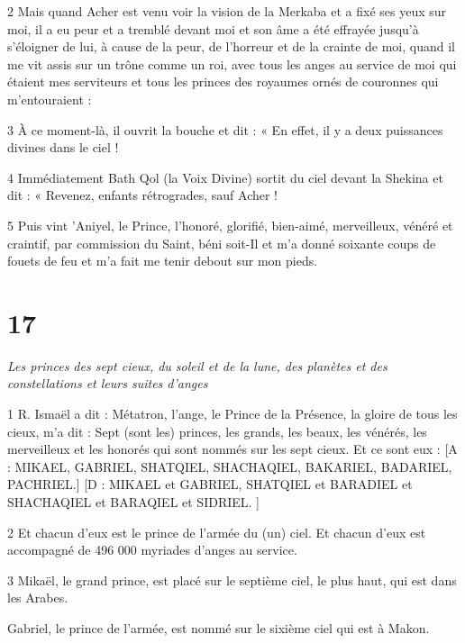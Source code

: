\par 2 Mais quand Acher est venu voir la vision de la Merkaba et a fixé ses yeux sur moi, il a eu peur et a tremblé devant moi et son âme a été effrayée jusqu'à s'éloigner de lui, à cause de la peur, de l'horreur et de la crainte de moi, quand il me vit assis sur un trône comme un roi, avec tous les anges au service de moi qui étaient mes serviteurs et tous les princes des royaumes ornés de couronnes qui m'entouraient :

\par 3 À ce moment-là, il ouvrit la bouche et dit : « En effet, il y a deux puissances divines dans le ciel !

\par 4 Immédiatement Bath Qol (la Voix Divine) sortit du ciel devant la Shekina et dit : « Revenez, enfants rétrogrades, sauf Acher !

\par 5 Puis vint 'Aniyel, le Prince, l'honoré, glorifié, bien-aimé, merveilleux, vénéré et craintif, par commission du Saint, béni soit-Il et m'a donné soixante coups de fouets de feu et m'a fait me tenir debout sur mon pieds.

\chapter{17}

\par \textit{Les princes des sept cieux, du soleil et de la lune, des planètes et des constellations et leurs suites d'anges}

\par 1 R. Ismaël a dit : Métatron, l'ange, le Prince de la Présence, la gloire de tous les cieux, m'a dit : Sept (sont les) princes, les grands, les beaux, les vénérés, les merveilleux et les honorés qui sont nommés sur les sept cieux. Et ce sont eux : [A : MIKAEL, GABRIEL, SHATQIEL, SHACHAQIEL, BAKARIEL, BADARIEL, PACHRIEL.] [D : MIKAEL et GABRIEL, SHATQIEL et BARADIEL et SHACHAQIEL et BARAQIEL et SIDRIEL. ]

\par 2 Et chacun d'eux est le prince de l'armée du (un) ciel. Et chacun d’eux est accompagné de 496 000 myriades d’anges au service.

\par 3 Mikaël, le grand prince, est placé sur le septième ciel, le plus haut, qui est dans les Arabes.

\par Gabriel, le prince de l'armée, est nommé sur le sixième ciel qui est à Makon.


